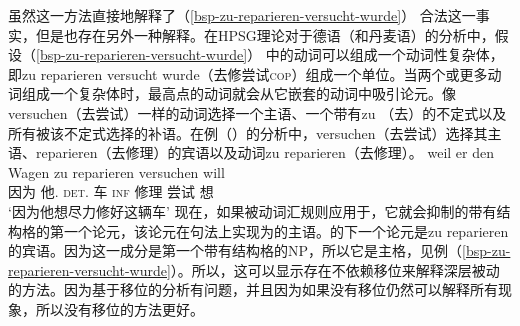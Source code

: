 \z
虽然这一方法直接地解释了（\ref{bsp-zu-reparieren-versucht-wurde}） 合法这一事实，但是也存在另外一种解释。在HPSG理论对于德语（和丹麦语）的分析中，假设（\ref{bsp-zu-reparieren-versucht-wurde}） 中的动词可以组成一个动词性复杂体，即zu reparieren versucht wurde（去修尝试\textsc{cop}）组成一个单位。当两个或更多动词组成一个复杂体时，最高点的动词就会从它嵌套的动词中吸引论元\citep{HN89a,HN94a,BvN98}。像versuchen（去尝试）一样的动词选择一个主语、一个带有zu （去）的不定式以及所有被该不定式选择的补语。在例（）的分析中，versuchen（去尝试）选择其主语、reparieren（去修理）的宾语以及动词zu reparieren（去修理）。
\ea
\gll weil er den Wagen zu reparieren versuchen will\\
     因为 他.\nom{} \textsc{det}.\acc{} 车 \textsc{inf} 修理 尝试 想\\
\glt `因为他想尽力修好这辆车'
\z
现在，如果被动词汇规则应用于，它就会抑制的带有结构格的第一个论元，该论元在句法上实现为的主语。的下一个论元是zu reparieren的宾语。因为这一成分是第一个带有结构格的NP，所以它是主格，见例（\ref{bsp-zu-reparieren-versucht-wurde}）。所以，这可以显示存在不依赖移位来解释深层被动的方法。因为基于移位的分析有问题，并且因为如果没有移位仍然可以解释所有现象，所以没有移位的方法更好。
